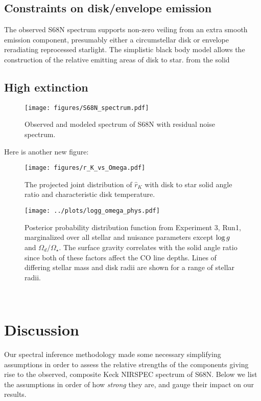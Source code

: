 \documentclass[twocolumn]{emulateapj}%
\begin{document}
\subsection{Constraints on disk/envelope emission}

The observed S68N spectrum supports non-zero veiling from an extra smooth emission component, presumably either a circumstellar disk or envelope reradiating reprocessed starlight.  The simplistic black body model allows the construction of the relative emitting areas of disk to star.  from the solid 

\subsection{High extinction}




\begin{figure*}
 \centering
 \texttt{[image: figures/S68N\_spectrum.pdf]}
 \caption{Observed and modeled spectrum of S68N with residual noise spectrum.}
 \label{fig:S68N_spectrum}
\end{figure*}


Here is another new figure:
\begin{figure*}
 \centering
 \texttt{[image: figures/r\_K\_vs\_Omega.pdf]}
 \caption{The projected joint distribution of $\hat r_K$ with disk to star solid angle ratio and characteristic disk temperature.}
 \label{fig:omega_rat}
\end{figure*}



\begin{figure}
 \centering
 \texttt{[image: ../plots/logg\_omega\_phys.pdf]}
 \caption{Posterior probability distribution function from Experiment 3, Run1, marginalized over all stellar and nuisance parameters except $\log g$ and $\Omega_d/\Omega_\star$.  The surface gravity correlates with the solid angle ratio since both of these factors affect the CO line depths.  Lines of differing stellar mass and disk radii are shown for a range of stellar radii.}
 \label{fig:posterior_loggOmega}
\end{figure}


~\clearpage


\section{Discussion}

Our spectral inference methodology made some necessary simplifying assumptions in order to assess the relative strengths of the components giving rise to the observed, composite Keck NIRSPEC spectrum of S68N.  Below we list the assumptions in order of how \emph{strong} they are, and gauge their impact on our results.  
\end{document}

